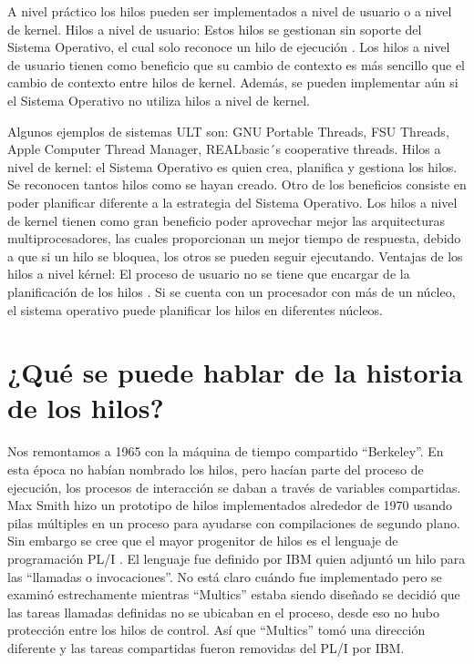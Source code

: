 \documentclass[11pt]{article}
\begin{document}
A nivel práctico los hilos pueden ser implementados a nivel de usuario o a nivel de kernel. 
Hilos a nivel de usuario: Estos hilos se gestionan sin soporte del Sistema Operativo, el cual solo reconoce un hilo de ejecución . Los hilos a nivel de usuario tienen como beneficio que su cambio de contexto es más sencillo que el cambio de contexto entre hilos de kernel. Además, se pueden implementar aún si el Sistema Operativo no utiliza hilos a nivel de kernel.

Algunos ejemplos de sistemas ULT son: GNU Portable Threads, FSU Threads, Apple Computer Thread Manager, REALbasic´s cooperative threads.
Hilos a nivel de kernel: el Sistema Operativo es quien crea, planifica y gestiona los hilos. Se reconocen tantos hilos como se hayan creado. Otro de los beneficios consiste en poder planificar diferente a la estrategia del Sistema Operativo. Los hilos a nivel de kernel tienen como gran beneficio poder aprovechar mejor las arquitecturas multiprocesadores, las cuales proporcionan un mejor tiempo de respuesta, debido a que si un hilo se bloquea, los otros se pueden seguir ejecutando.
Ventajas de los hilos a nivel kérnel: El proceso de usuario no se tiene que encargar de la planificación de los hilos . Si se cuenta con un procesador con más de un núcleo, el sistema operativo puede planificar los hilos en diferentes núcleos.

\section{¿Qué se puede hablar de la historia de los hilos?}

Nos remontamos a 1965 con la máquina de tiempo compartido “Berkeley”. En esta época no habían nombrado los hilos, pero hacían parte del proceso de ejecución, los procesos de interacción se daban a través de variables compartidas. Max Smith hizo un prototipo de hilos implementados alrededor de 1970 usando pilas múltiples en un proceso para ayudarse con compilaciones de segundo plano.
Sin embargo se cree que el mayor progenitor de hilos es el lenguaje de programación PL/I . El lenguaje fue definido por IBM quien adjuntó un hilo para las “llamadas o invocaciones”. No está claro cuándo fue implementado pero se examinó estrechamente mientras “Multics” estaba siendo diseñado se decidió que las tareas llamadas definidas no se ubicaban en el proceso, desde eso no hubo protección entre los hilos de control. Así que “Multics” tomó una dirección diferente y las tareas compartidas fueron removidas del PL/I por IBM.
\end{document}
